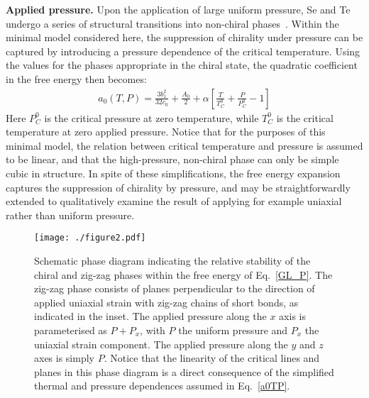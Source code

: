 \documentclass[aps,prl,twocolumn,superscriptaddress,groupedaddress]{revtex4}
\begin{document}
{\bf Applied pressure.} Upon the application of large uniform pressure, Se and Te undergo a series of structural transitions into non-chiral phases~\cite{pressure1,pressure2}. Within the minimal model considered here, the suppression of chirality under pressure can be captured by introducing a pressure dependence of the critical temperature. Using the values for the phases appropriate in the chiral state, the quadratic coefficient in the free energy then becomes:
\begin{align}
a_0(T,P) = \frac{3 b_1^2}{32 c_0} + \frac{A_0}{2} + \alpha \left[ \frac{T}{T_C^0} + \frac{P}{P_C^0} - 1\right]
\label{a0TP}
\end{align}
Here $P_C^0$ is the critical pressure at zero temperature, while $T_C^0$ is the critical temperature at zero applied pressure. Notice that for the purposes of this minimal model, the relation between critical temperature and pressure is assumed to be linear, and that the high-pressure, non-chiral phase can only be simple cubic in structure. In spite of these simplifications, the free energy expansion captures the suppression of chirality by pressure, and may be straightforwardly extended to qualitatively examine the result of applying for example uniaxial rather than uniform pressure.
%
\begin{figure}
\begin{centering}
\texttt{[image: ./figure2.pdf]}
\end{centering}
\caption{\label{fig:zigzag} Schematic phase diagram indicating the relative stability of the chiral and zig-zag phases within the free energy of Eq.~\eqref{GL_P}. The zig-zag phase consists of planes  perpendicular to the direction of applied uniaxial strain with zig-zag chains of short bonds, as indicated in the inset. The applied pressure along the $x$ axis is parameterised as $P+P_x$, with $P$ the uniform pressure and $P_x$ the uniaxial strain component. The applied pressure along the $y$ and $z$ axes is simply $P$. Notice that the linearity of the critical lines and planes in this phase diagram is a direct consequence of the simplified thermal and pressure dependences assumed in Eq.~\eqref{a0TP}.}
\end{figure}
\end{document}
